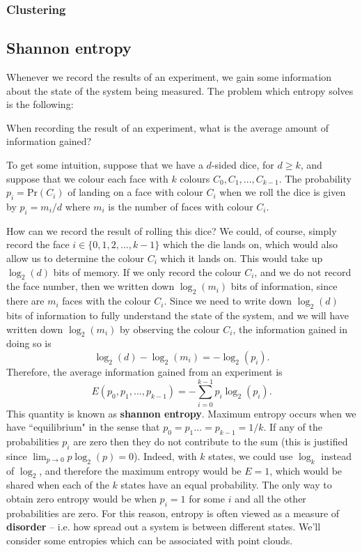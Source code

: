 \documentclass[a4paper,11pt,twoside]{article}
\theoremstyle{definition}
\theoremstyle{remark}
\begin{document}
\subsubsection{Clustering}\label{clus}
\subsection{Shannon entropy}
Whenever we record the results of an experiment, we gain some information about the state of the system being measured. The problem which entropy solves is the following:
\begin{center}
When recording the result of an experiment, what is the average amount of information gained?
\end{center}
To get some intuition, suppose that we have a $d$-sided dice, for $d\geqslant k$, and suppose that we colour each face with $k$ colours $C_0,C_1,\dots,C_{k-1}$. The probability $p_i=\mathrm{Pr}(C_i)$ of landing on a face with colour $C_i$ when we roll the dice is given by $p_i=m_i/d$ where $m_i$ is the number of faces with colour $C_i$.

How can we record the result of rolling this dice? We could, of course, simply record the face $i\in\{0,1,2,\dots, k-1\}$ which the die lands on, which would also allow us to determine the colour $C_i$ which it lands on. This would take up $\log_2(d)$ bits of memory. If we only record the colour $C_i$, and we do not record the face number, then we written down $\log_2(m_i)$ bits of information, since there are $m_i$ faces with the colour $C_i$. Since we need to write down $\log_2(d)$ bits of information to fully understand the state of the system, and we will have written down $\log_2(m_i)$ by observing the colour $C_i$, the information gained in doing so is
\begin{displaymath}
\log_2(d)-\log_2(m_i)=-\log_2(p_i).
\end{displaymath}
Therefore, the average information gained from an experiment is
\begin{displaymath}
E(p_0,p_1,\dots, p_{k-1})=-\sum^{k-1}_{i=0}p_i\log_2(p_i).
\end{displaymath}
This quantity is known as \textbf{shannon entropy}. Maximum entropy occurs when we have ``equilibrium" in the sense that $p_0=p_1\dots=p_{k-1}=1/k$. If any of the probabilities $p_i$ are zero then they do not contribute to the sum (this is justified since $\lim_{p\to 0}p\log_2(p)=0$). Indeed, with $k$ states, we could use $\log_k$ instead of $\log_2$, and therefore the maximum entropy would be $E=1$, which would be shared when each of the $k$ states have an equal probability. The only way to obtain zero entropy would be when $p_i=1$ for some $i$ and all the other probabilities are zero. For this reason, entropy is often viewed as a measure of \textbf{disorder} -- i.e. how spread out a system is between different states. We'll consider some entropies which can be associated with point clouds.
\end{document}
